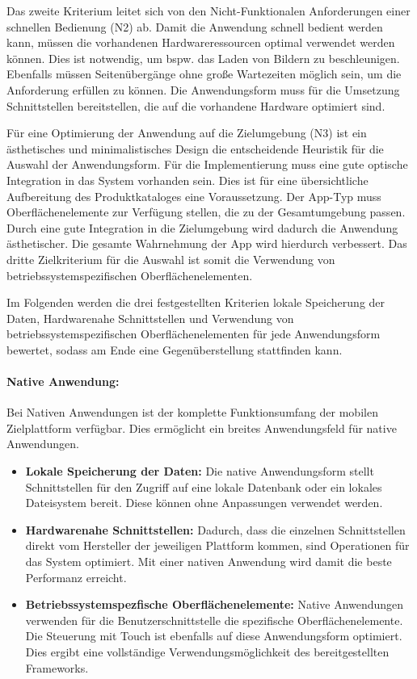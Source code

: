 Das zweite Kriterium leitet sich von den Nicht-Funktionalen Anforderungen einer schnellen Bedienung (N2) ab. Damit die Anwendung schnell bedient werden kann, müssen die vorhandenen Hardwareressourcen optimal verwendet werden können. Dies ist notwendig, um bspw. das Laden von Bildern zu beschleunigen. Ebenfalls müssen Seitenübergänge ohne große Wartezeiten möglich sein, um die Anforderung erfüllen zu können. Die Anwendungsform muss für die Umsetzung Schnittstellen bereitstellen, die auf die vorhandene Hardware optimiert sind.

Für eine Optimierung der Anwendung auf die Zielumgebung (N3) ist ein ästhetisches und minimalistisches Design die entscheidende Heuristik für die Auswahl der Anwendungsform. Für die Implementierung muss eine gute optische Integration in das System vorhanden sein. Dies ist für eine übersichtliche Aufbereitung des Produktkataloges eine Voraussetzung. Der App-Typ muss Oberflächenelemente zur Verfügung stellen, die zu der Gesamtumgebung passen. Durch eine gute Integration in die Zielumgebung wird dadurch die Anwendung ästhetischer. Die gesamte Wahrnehmung der App wird hierdurch verbessert. Das dritte Zielkriterium für die Auswahl ist somit die Verwendung von betriebssystemspezifischen Oberflächenelementen.    

Im Folgenden werden die drei festgestellten Kriterien lokale Speicherung der Daten, Hardwarenahe Schnittstellen und Verwendung von betriebssystemspezifischen Oberflächenelementen  für jede Anwendungsform bewertet, sodass am Ende eine Gegenüberstellung stattfinden kann.

\paragraph{Native Anwendung: }Bei Nativen Anwendungen ist der komplette Funktionsumfang der mobilen Zielplattform verfügbar. Dies ermöglicht ein breites Anwendungsfeld für native Anwendungen.
\begin{itemize}
\item \textbf{Lokale Speicherung der Daten:} Die native Anwendungsform stellt Schnittstellen für den Zugriff auf eine lokale Datenbank oder ein lokales Dateisystem bereit. Diese können ohne Anpassungen verwendet werden. 

\item \textbf{Hardwarenahe Schnittstellen:} Dadurch, dass die einzelnen Schnittstellen direkt vom Hersteller der jeweiligen Plattform kommen, sind Operationen für das System optimiert. Mit einer nativen Anwendung wird damit die beste Performanz erreicht. 

\item \textbf{Betriebssystemspezfische Oberflächenelemente:} Native Anwendungen verwenden für die Benutzerschnittstelle die spezifische Oberflächenelemente. Die Steuerung mit Touch ist ebenfalls auf diese Anwendungsform optimiert. Dies ergibt eine vollständige Verwendungsmöglichkeit des bereitgestellten Frameworks.
\end{itemize}


